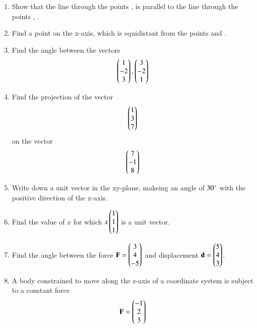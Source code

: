 \begin{enumerate}[label=\arabic*.,ref=\thesubsection.\theenumi]
\item Show that the line through the points ,  is parallel to the line through the points   , .
\item Find a point on the x-axis, which is equidistant from the points  and .
\item Find the angle between the vectors 
\begin{align}
\begin{pmatrix}1\\-2\\3\end{pmatrix},
\begin{pmatrix}3\\-2\\1\end{pmatrix}
\end{align}
\item Find the projection of the vector 
\begin{align}
\begin{pmatrix}1\\3\\7\end{pmatrix}
\end{align}
on the vector
\begin{align}
\begin{pmatrix}7\\-1\\8\end{pmatrix}
\end{align}
\item Write down a unit vector in the xy-plane, makeing an angle of $30\degree$ with the positive direction of the x-axis.
\item Find the value of $x$ for which $x\begin{pmatrix}1\\1\\1\end{pmatrix}$ is a unit vector.
\item Find the angle between the force $\mathbf{F} = \begin{pmatrix}3\\4\\-5\end{pmatrix}$ and displacement $\mathbf{d} = \begin{pmatrix}5\\4\\3\end{pmatrix}$.
%
\item A body constrained to move along the z-axis of a coordinate system is subject to a constant force
\begin{align}
\vec{F} = \myvec{-1\\2\\3}

\end{align}
\end{enumerate}
